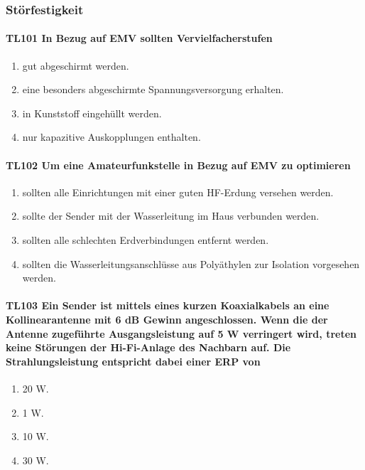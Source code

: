 \documentclass[8pt]{article}
\begin{document}
\subsubsection{Störfestigkeit}
\paragraph*{TL101 In Bezug auf EMV sollten Vervielfacherstufen} 
\begin{enumerate}[nolistsep,label=\Alph*]
\item gut abgeschirmt werden.
\item eine besonders abgeschirmte Spannungsversorgung erhalten.
\item in Kunststoff eingehüllt werden.
\item nur kapazitive Auskopplungen enthalten.
\end{enumerate}

\paragraph*{TL102 Um eine Amateurfunkstelle in Bezug auf EMV zu optimieren} 
\begin{enumerate}[nolistsep,label=\Alph*]
\item sollten alle Einrichtungen mit einer guten HF-Erdung versehen werden.
\item sollte der Sender mit der Wasserleitung im Haus verbunden werden.
\item sollten alle schlechten Erdverbindungen entfernt werden.
\item sollten die Wasserleitungsanschlüsse aus Polyäthylen zur Isolation vorgesehen werden.
\end{enumerate}

\paragraph*{TL103 Ein Sender ist mittels eines kurzen Koaxialkabels an eine Kollinearantenne mit 6 dB Gewinn angeschlossen. Wenn die der Antenne zugeführte Ausgangsleistung auf 5 W verringert wird, treten keine Störungen der Hi-Fi-Anlage des Nachbarn auf. Die Strahlungsleistung entspricht dabei einer ERP von}
\begin{enumerate}[nolistsep,label=\Alph*]
\item 20 W.
\item 1 W.
\item 10 W.
\item 30 W.
\end{enumerate}
\end{document}
